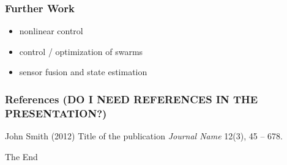 \documentclass{beamer}
\begin{document}
\begin{frame}
\frametitle{ Further Work }
\begin{itemize}
\item nonlinear control
\item control / optimization of swarms
\item sensor fusion and state estimation
\end{itemize}
\end{frame}





\begin{frame}

\frametitle{References ({\color{red}DO I NEED REFERENCES IN THE PRESENTATION?})}

\footnotesize{
\begin{thebibliography}{99}
 John Smith (2012)
\newblock Title of the publication
\newblock \emph{Journal Name} 12(3), 45 -- 678.
\end{thebibliography}
}
\end{frame}


\begin{frame}
\Huge{\centerline{The End}}
\end{frame}

\end{document}
